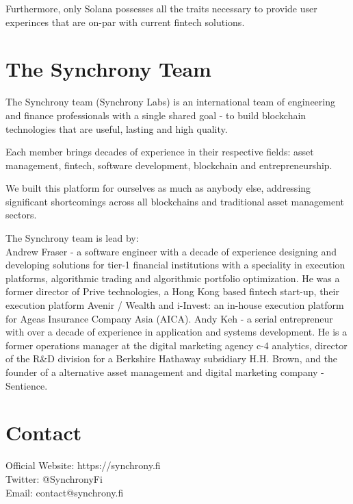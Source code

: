 \documentclass[10pt]{article}
\begin{document}
					Furthermore, only Solana possesses all the traits necessary to provide user
					experinces that are on-par with current fintech solutions.

					\section{The Synchrony Team}
					The Synchrony team (Synchrony Labs) is an international team of engineering and
					finance professionals with a single shared goal - to build blockchain
					technologies that are useful, lasting and high quality.

					Each member brings decades of experience in their respective fields: asset
					management, fintech, software development, blockchain and entrepreneurship.

					We built this platform for ourselves as much as anybody else, addressing
					significant shortcomings across all blockchains and traditional asset management
					sectors.
					\vspace{1em}

					\noindent The Synchrony team is lead by:\\
					Andrew Fraser - a software engineer with a decade of experience designing and
					developing solutions for tier-1 financial institutions with a speciality in
					execution platforms, algorithmic trading and algorithmic portfolio optimization.
					He was a former director of Prive technologies, a Hong Kong based fintech
					start-up, their execution platform Avenir / Wealth and i-Invest: an in-house
					execution platform for Ageas Insurance Company Asia (AICA).
					\vspace{1em}
					Andy Keh - a serial entrepreneur with over a decade of experience in application
					and systems development. He is a former operations manager at the digital
					marketing agency c-4 analytics, director of the R\&D division for a Berkshire
					Hathaway subsidiary H.H. Brown, and the founder of a alternative asset
					management and digital marketing company - Sentience.

					\section{Contact}
					Official Website: https://synchrony.fi\\
					Twitter: @SynchronyFi\\
					Email: contact@synchrony.fi


					

	
\end{document}
